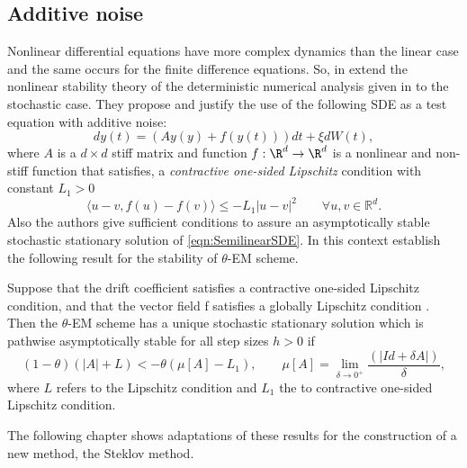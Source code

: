 \subsection*{Additive noise}
		Nonlinear differential equations have more complex  dynamics than the linear case and
	the same  occurs for the finite difference equations. So,  \citeauthor*{Caraballo2006} in
	\cite{Caraballo2006}  extend the nonlinear stability theory of the deterministic
	numerical  analysis given in \cite{kloeden1999towards} to the stochastic
	case. They propose and justify the use of the following SDE as a test equation with additive noise:
	\begin{equation}\label{eqn:SemilinearSDE}
		dy(t)=\left(Ay(y)+f(y(t))\right)dt+\xi dW(t),
	\end{equation}
	where $A$ is a $d \times d$ stiff matrix and function $f : \R^d \to \R^d $ is a nonlinear and non-stiff function 
	that satisfies, a
	{\it contractive one-sided Lipschitz} condition with constant
	$L_1>0$
	\begin{equation}\label{cl}
		\langle
			u - v,f(u)-f(v)
		\rangle\leq
		-L_1|u-v|^2\qquad \forall u,v\in \mathbb{R}^d.
	\end{equation}
Also the authors give sufficient conditions to assure an asymptotically stable stochastic stationary solution
of \eqref{eqn:SemilinearSDE}. In this context establish the following result for the stability of $\theta$-EM scheme.
\begin{thm}
	Suppose that the drift coefficient satisfies a contractive one-sided Lipschitz condition, and that the vector field 
	f satisfies a globally Lipschitz condition . Then the $\theta$-EM scheme has a unique stochastic stationary 
	solution 
	which is pathwise asymptotically stable for all step sizes $h> 0$
	if
	$$
		(1-\theta) (|A|+L) <-\theta (\mu[A] - L_1),
		\qquad
		\mu[A] = \lim_{\delta \to 0^+} \frac{(|Id + \delta A|)}{\delta},
	$$
	where $L$ refers to the Lipschitz condition and $L_1$  the to contractive one-sided Lipschitz condition.
\end{thm}












The following chapter shows adaptations of these results for the construction of a new method, the Steklov method.
